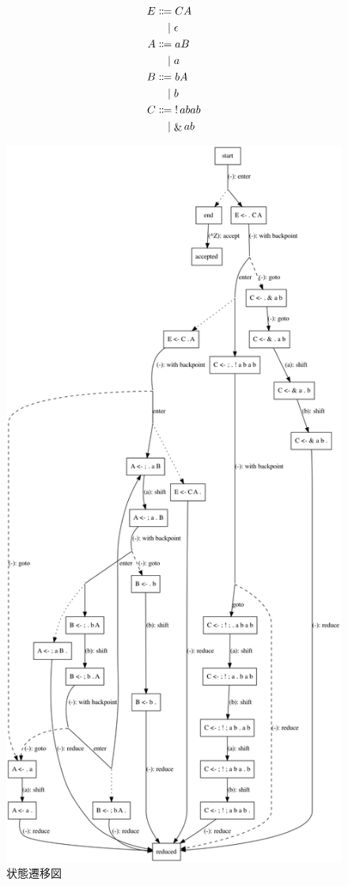 \begin{align*}
  E
  &\BNFassign C A \\
  &\BNFor \epsilon \\
  A
  &\BNFassign a B \\
  &\BNFor a \\
  B
  &\BNFassign b A \\
  &\BNFor b \\
  C
  &\BNFassign \mathop{!} abab \\
  &\BNFor \mathop{\&} ab
\end{align*}

\begin{figure}
  \centering
  \includegraphics[height=0.9\textheight]{asset/implementation-note-of-peg-parser/sample-grammar.png}
  \caption{状態遷移図}
\end{figure}

